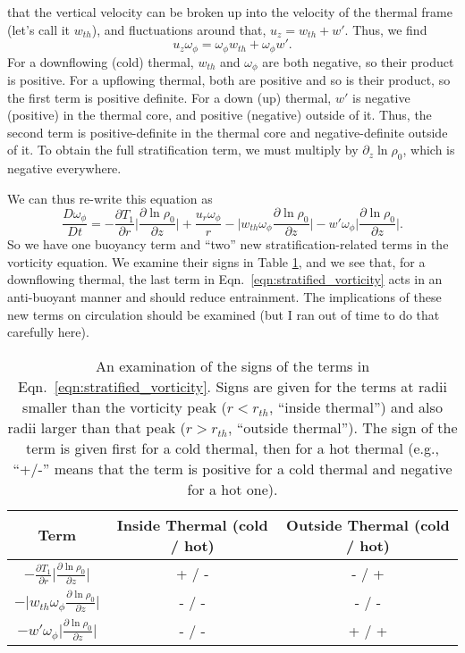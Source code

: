 \documentclass[onecolumn, amsmath, amsfonts, amssymb]{aastex62}
\begin{document}
that the vertical velocity can be broken up into the velocity of the thermal frame
(let's call it $w_{th}$), and fluctuations around that, $u_z = w_{th} + w'$. Thus, we find
$$
u_z\omega_\phi = \omega_\phi w_{th} + \omega_\phi w'.
$$
For a downflowing (cold) thermal, $w_{th}$ and $\omega_\phi$ are both negative, so their
product is positive. For a upflowing thermal, both are positive and so is their product, so
the first term is positive definite. For a down (up) thermal, $w'$ is negative (positive) in the
thermal core, and positive (negative) outside of it. Thus, the second term is positive-definite
in the thermal core and negative-definite outside of it. To obtain the full stratification
term, we must multiply by $\partial_z\ln\rho_0$, which is negative everywhere.

We can thus re-write this equation as
\begin{equation}
\frac{D \omega_\phi}{D t} = -\frac{\partial T_1}{\partial r}\bigg|\frac{\partial\ln\rho_0}{\partial z}\bigg|
+ \frac{u_r\omega_\phi}{r} - \bigg| w_{th} \omega_\phi \frac{\partial\ln\rho_0}{\partial z}\bigg|
- w' \omega_\phi \bigg|\frac{\partial\ln\rho_0}{\partial z}\bigg|.
\label{eqn:stratified_vorticity}
\end{equation}
So we have one buoyancy term and ``two'' new stratification-related terms in the vorticity
equation. We examine their signs in Table \ref{table:signs}, and we see that, for a downflowing
thermal, the last term in Eqn.~\ref{eqn:stratified_vorticity} acts in an anti-buoyant manner
and should reduce entrainment. The implications of these new terms on circulation should be examined
(but I ran out of time to do that carefully here).

\begin{table}[h!]
\caption{An examination of the signs of the terms in Eqn.~\ref{eqn:stratified_vorticity}.
Signs are given for the terms at radii smaller than the vorticity peak ($r < r_{th}$,
``inside thermal'') and
also radii larger than that peak ($r > r_{th}$, ``outside thermal''). The sign of the
term is given first for a cold thermal, then for a hot thermal (e.g., ``+/-'' means that
the term is positive for a cold thermal and negative for a hot one).}
\label{table:signs}
\begin{center}
\begin{tabular}{ c c c }
\hline																	
Term	& Inside Thermal (cold / hot) 	& Outside Thermal (cold / hot)\\
\hline
$-\frac{\partial T_1}{\partial r}\bigg|\frac{\partial\ln\rho_0}{\partial z}\bigg|$ 	& + / - & - / + \\
$-\bigg| w_{th} \omega_\phi \frac{\partial\ln\rho_0}{\partial z}\bigg|$ 			& - / - & - / - \\
$-w' \omega_\phi \bigg|\frac{\partial\ln\rho_0}{\partial z}\bigg|$					& - / - & + / + \\	
\hline																	
\end{tabular}
\end{center}
\end{table}
\end{document}
